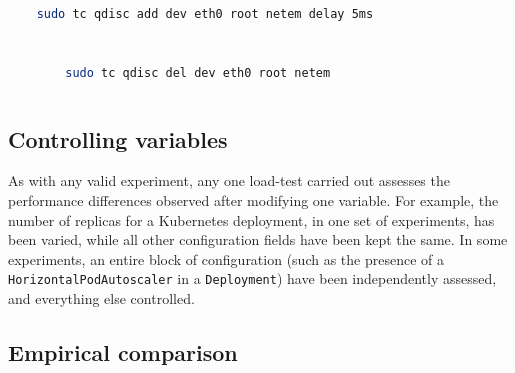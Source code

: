 \begin{center}
    \begin{minipage}{\linewidth}
    \centering
    \begin{lstlisting}[language=bash, caption={Pre-test latency simulation command},label=lst:pre-test-latency]
    
    sudo tc qdisc add dev eth0 root netem delay 5ms
    
    \end{lstlisting}
    \end{minipage}
\end{center}

\begin{center}
    \begin{minipage}{\linewidth}
    \centering
    \begin{lstlisting}[language=bash, caption={Post-test latency simulation teardown},label=lst:post-test-latency]
    
        sudo tc qdisc del dev eth0 root netem
    
    \end{lstlisting}
    \end{minipage}
\end{center}





\subsection{Controlling variables}

As with any valid experiment, any one load-test carried out assesses the performance differences observed after modifying one variable. For example, the number of replicas for a Kubernetes deployment, in one set of experiments, has been varied, while all other configuration fields have been kept the same. In some experiments, an entire block of configuration (such as the presence of a \verb|HorizontalPodAutoscaler| in a \verb|Deployment|) have been independently assessed, and everything else controlled. 

\subsection{Empirical comparison}

